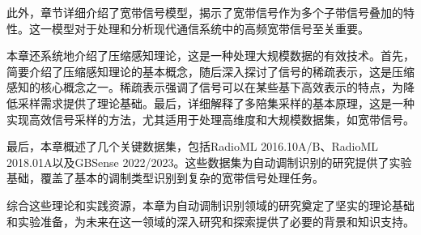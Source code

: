 此外，章节详细介绍了宽带信号模型，揭示了宽带信号作为多个子带信号叠加的特性。这一模型对于处理和分析现代通信系统中的高频宽带信号至关重要。

本章还系统地介绍了压缩感知理论，这是一种处理大规模数据的有效技术。首先，简要介绍了压缩感知理论的基本概念，随后深入探讨了信号的稀疏表示，这是压缩感知的核心概念之一。稀疏表示强调了信号可以在某些基下高效表示的特点，为降低采样需求提供了理论基础。最后，详细解释了多陪集采样的基本原理，这是一种实现高效信号采样的方法，尤其适用于处理高维度和大规模数据集，如宽带信号。

最后，本章概述了几个关键数据集，包括RadioML 2016.10A/B、RadioML 2018.01A以及GBSense 2022/2023。这些数据集为自动调制识别的研究提供了实验基础，覆盖了基本的调制类型识别到复杂的宽带信号处理任务。

综合这些理论和实践资源，本章为自动调制识别领域的研究奠定了坚实的理论基础和实验准备，为未来在这一领域的深入研究和探索提供了必要的背景和知识支持。